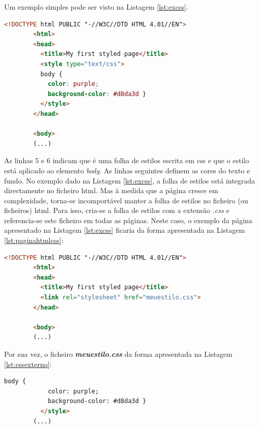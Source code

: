 Um exemplo simples pode ser visto na Listagem \ref{lst:excss}.

\begin{minipage}{0.9\linewidth}
    \begin{lstlisting}[language=HTML, caption=Exemplo \acrshort{css} incluído na página \acrshort{html} \cite{Startingcss}, label=lst:excss]
		<!DOCTYPE html PUBLIC "-//W3C//DTD HTML 4.01//EN">
		<html>
		<head>
		  <title>My first styled page</title>
		  <style type="text/css">
		  body {
			color: purple;
			background-color: #d8da3d }
		  </style>
		</head>
		
		<body>
		(...)
	\end{lstlisting}
\end{minipage}

As linhas 5 e 6 indicam que é uma folha de estilos escrita em \acrshort{css} e que o estilo está aplicado ao elemento \textit{body}. As linhas seguintes definem as cores do texto e fundo. No exemplo dado na Listagem \ref{lst:excss}, a folha de estilos está integrada directamente no ficheiro \acrshort{html}. Mas à medida que a página cresce em complexidade, torna-se incomportável manter a folha de estilos no ficheiro (ou ficheiros) \acrshort{html}. Para isso, cria-se a folha de estilos com a extensão \textit{.css} e referencia-se este ficheiro em todas as páginas. Neste caso, o exemplo da página apresentado na Listagem \ref{lst:excss} ficaria da forma apresentada na Listagem \ref{lst:paginahtmlcss}:

\begin{minipage}{0.9\linewidth}
    \begin{lstlisting}[language=HTML, caption=Exemplo da página \acrshort{html} com o \acrshort{css} definida externamente \cite{Startingcss}, label=lst:paginahtmlcss]
		<!DOCTYPE html PUBLIC "-//W3C//DTD HTML 4.01//EN">
		<html>
		<head>
		  <title>My first styled page</title>
		  <link rel="stylesheet" href="meuestilo.css">
		</head>
		
		<body>
		(...)
	\end{lstlisting}
\end{minipage}

Por sua vez, o ficheiro \textit{\textbf{meuestilo.css}} da forma apresentada na Listagem \ref{lst:cssexterno}:

\begin{minipage}{0.9\linewidth}
    \begin{lstlisting}[language=HTML, caption=Exemplo do \acrshort{css} definido externamente \cite{Startingcss}, label=lst:cssexterno]
		body {
			color: purple;
			background-color: #d8da3d }
		  </style>
		(...)
	\end{lstlisting}
\end{minipage}

